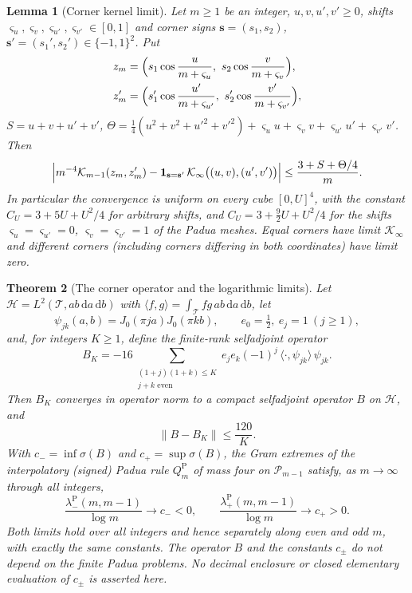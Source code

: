 \documentclass[preprint,12pt,a4paper]{elsarticle}
\newtheorem{theorem}{Theorem}[section]
\newtheorem{lemma}[theorem]{Lemma}
\theoremstyle{remark}
\newcommand{\Pa}{\mathrm P}
\newcommand{\dd}{\,\mathrm d}
\begin{document}
\begin{lemma}[Corner kernel limit]\label{lem:corner-kernel}
Let $m\ge1$ be an integer, $u,v,u',v'\ge0$, shifts
$\varsigma_u,\varsigma_v,\varsigma_{u'},\varsigma_{v'}\in[0,1]$ and corner signs
$\mathbf s=(s_1,s_2)$, $\mathbf s'=(s_1',s_2')\in\{-1,1\}^2$. Put
\begin{align*}
 z_m&=\Bigl(s_1\cos\frac u{m+\varsigma_u},\ s_2\cos\frac v{m+\varsigma_v}\Bigr),\\
 z_m'&=\Bigl(s_1'\cos\frac {u'}{m+\varsigma_{u'}},\ s_2'\cos\frac {v'}{m+\varsigma_{v'}}\Bigr),
\end{align*}
$S=u+v+u'+v'$,
$\Theta=\frac14(u^2+v^2+u'^2+v'^2)+\varsigma_uu+\varsigma_vv+\varsigma_{u'}u'+\varsigma_{v'}v'$.
Then
\begin{equation}\label{eq:kernel-limit}
 \Bigl|m^{-4}\mathcal K_{m-1}(z_m,z_m')-\boldsymbol1_{\mathbf s=\mathbf s'}\,
   \mathcal K_\infty\bigl((u,v),(u',v')\bigr)\Bigr|\le\frac{3+S+\Theta/4}m .
\end{equation}
In particular the convergence is uniform on every cube $[0,U]^4$, with the
constant $C_U=3+5U+U^2/4$ for arbitrary shifts, and $C_U=3+\frac92U+U^2/4$
for the shifts $\varsigma_u=\varsigma_{u'}=0$, $\varsigma_v=\varsigma_{v'}=1$ of the
Padua meshes. Equal corners have limit $\mathcal K_\infty$ and different
corners (including corners differing in both coordinates) have limit zero.
\end{lemma}

\begin{theorem}[The corner operator and the logarithmic limits]\label{thm:corner-operator}
Let $\mathcal H=L^2(\mathcal T,ab\dd a\dd b)$ with
$\langle f,g\rangle=\int_{\mathcal T}fg\,ab\dd a\dd b$, let
\[
 \psi_{jk}(a,b)=J_0(\pi ja)J_0(\pi kb),\qquad e_0=\tfrac12,\ e_j=1\ (j\ge1),
\]
and, for integers $K\ge1$, define the finite-rank selfadjoint operator
\begin{equation}\label{eq:B-K}
 B_K=-16\sum_{\substack{(1+j)(1+k)\le K\\ j+k\text{ even}}}
      e_je_k(-1)^j\,\langle\cdot,\psi_{jk}\rangle\,\psi_{jk}.
\end{equation}
Then $B_K$ converges in operator norm to a compact selfadjoint operator
$B$ on $\mathcal H$, and
\begin{equation}\label{eq:B-tail}
 \|B-B_K\|\le\frac{120}K .
\end{equation}
With $c_-=\inf\sigma(B)$ and $c_+=\sup\sigma(B)$, the Gram extremes of the
interpolatory (signed) Padua rule $Q_m^\Pa$ of mass four on $\mathcal P_{m-1}$ satisfy,
as $m\to\infty$ through all integers,
\begin{equation}\label{eq:corner-limits}
 \frac{\lambda^\Pa_-(m,m-1)}{\log m}\longrightarrow c_-<0,\qquad
 \frac{\lambda^\Pa_+(m,m-1)}{\log m}\longrightarrow c_+>0 .
\end{equation}
Both limits hold over all integers and hence separately along even and odd
$m$, with exactly the same constants. The operator $B$ and the constants
$c_\pm$ do not depend on the finite Padua problems. No decimal enclosure or
closed elementary evaluation of $c_\pm$ is asserted here.
\end{theorem}
\end{document}
